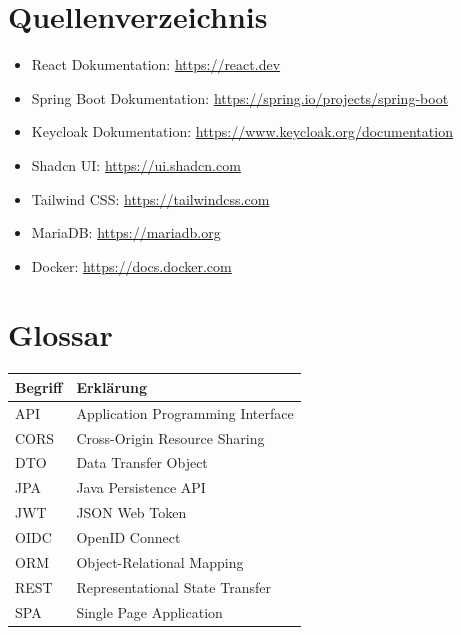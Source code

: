 \documentclass[a4paper,12pt,twoside]{report}
\begin{document}
\newpage

\section{Quellenverzeichnis}
\begin{itemize}
    \item React Dokumentation: \url{https://react.dev}
    \item Spring Boot Dokumentation: \url{https://spring.io/projects/spring-boot}
    \item Keycloak Dokumentation: \url{https://www.keycloak.org/documentation}
    \item Shadcn UI: \url{https://ui.shadcn.com}
    \item Tailwind CSS: \url{https://tailwindcss.com}
    \item MariaDB: \url{https://mariadb.org}
    \item Docker: \url{https://docs.docker.com}
\end{itemize}

\section{Glossar}
\begin{table}[H]
\begin{tabularx}{\textwidth}{l X}
\toprule
\textbf{Begriff} & \textbf{Erklärung} \\
\midrule
API & Application Programming Interface \\
CORS & Cross-Origin Resource Sharing \\
DTO & Data Transfer Object \\
JPA & Java Persistence API \\
JWT & JSON Web Token \\
OIDC & OpenID Connect \\
ORM & Object-Relational Mapping \\
REST & Representational State Transfer \\
SPA & Single Page Application \\
\bottomrule
\end{tabularx}
\end{table}
\end{document}
